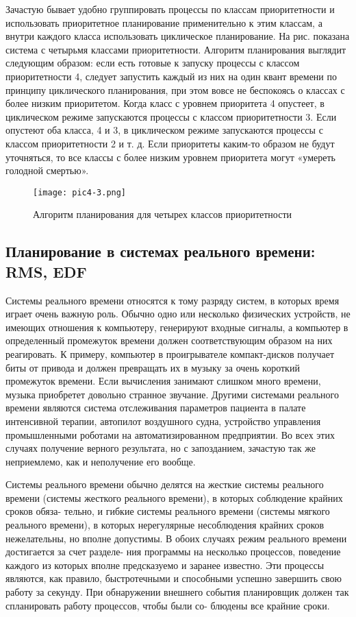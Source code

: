 Зачастую бывает удобно группировать процессы по классам приоритетности и использовать приоритетное планирование применительно к этим классам, а внутри каждого класса использовать циклическое планирование. На рис. показана система с четырьмя классами приоритетности. Алгоритм планирования выглядит следующим образом: если есть готовые к запуску процессы с классом приоритетности 4, следует запустить каждый из них на один квант времени по принципу циклического планирования, при этом вовсе не беспокоясь о классах с более низким приоритетом. Когда класс с уровнем приоритета 4 опустеет, в циклическом режиме запускаются процессы с классом приоритетности 3. Если опустеют оба класса, 4 и 3, в циклическом режиме запускаются процессы с классом приоритетности 2 и т. д. Если приоритеты каким-то образом не будут уточняться, то все классы с более низким уровнем приоритета могут «умереть голодной смертью».

\begin{figure}[!h]\center
   \texttt{[image: pic4-3.png]}
   \caption{Алгоритм планирования для четырех классов приоритетности}
\end{figure}
\newpage
\subsection{Планирование в системах реального времени: RMS, EDF}

Системы реального времени относятся к тому разряду систем, в которых время играет
очень важную роль. Обычно одно или несколько физических устройств, не имеющих
отношения к компьютеру, генерируют входные сигналы, а компьютер в определенный
промежуток времени должен соответствующим образом на них реагировать. К примеру, компьютер в проигрывателе компакт-дисков получает биты от привода и должен
превращать их в музыку за очень короткий промежуток времени. Если вычисления
занимают слишком много времени, музыка приобретет довольно странное звучание.
Другими системами реального времени являются система отслеживания параметров
пациента в палате интенсивной терапии, автопилот воздушного судна, устройство
управления промышленными роботами на автоматизированном предприятии. Во всех
этих случаях получение верного результата, но с запозданием, зачастую так же неприемлемо, как и неполучение его вообще.

Системы реального времени обычно делятся на жесткие системы реального времени
(системы жесткого реального времени), в которых соблюдение крайних сроков обяза-
тельно, и гибкие системы реального времени (системы мягкого реального времени),
в которых нерегулярные несоблюдения крайних сроков нежелательны, но вполне
допустимы. В обоих случаях режим реального времени достигается за счет разделе-
ния программы на несколько процессов, поведение каждого из которых вполне предсказуемо и заранее известно. Эти процессы являются, как правило, быстротечными
и способными успешно завершить свою работу за секунду. При обнаружении внешнего
события планировщик должен так спланировать работу процессов, чтобы были со-
блюдены все крайние сроки.

